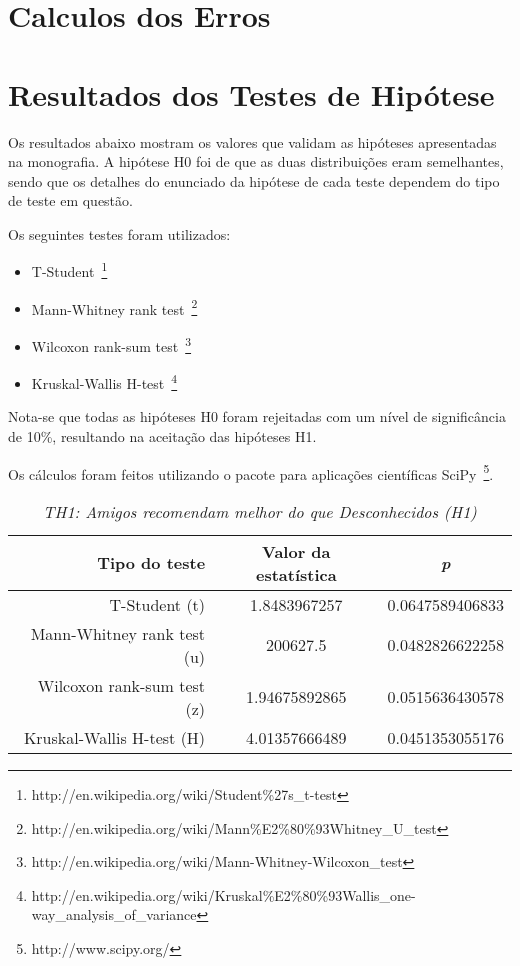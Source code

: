 \appendix
\chapter{Calculos dos Erros}
\chapter{Resultados dos Testes de Hipótese}
\label{anexo_hipoteses}

Os resultados abaixo mostram os valores que validam as hipóteses apresentadas na monografia. A hipótese H0 foi de que as duas distribuições eram semelhantes, sendo que os detalhes do enunciado da hipótese de cada teste dependem do tipo de teste em questão.

Os seguintes testes foram utilizados:

\begin{itemize}
    \item T-Student~\footnote{http://en.wikipedia.org/wiki/Student\%27s\_t-test}
    \item Mann-Whitney rank test~\footnote{http://en.wikipedia.org/wiki/Mann\%E2\%80\%93Whitney\_U\_test}
    \item Wilcoxon rank-sum test~\footnote{http://en.wikipedia.org/wiki/Mann-Whitney-Wilcoxon\_test}
    \item Kruskal-Wallis H-test~\footnote{http://en.wikipedia.org/wiki/Kruskal\%E2\%80\%93Wallis\_one-way\_analysis\_of\_variance}

\end{itemize}

Nota-se que todas as hipóteses H0 foram rejeitadas com um nível de significância de 10\%, resultando na aceitação das hipóteses H1.

Os cálculos foram feitos utilizando o pacote para aplicações científicas SciPy~\footnote{http://www.scipy.org/}.

\begin{table}
\centering
\begin{tabular}{|r|c|c|}
    \hline
    \textbf{Tipo do teste} & \textbf{Valor da estatística} & \textbf{\textit{p}} \\
    \hline
T-Student (t) & 1.8483967257 & 0.0647589406833 \\
\hline 
Mann-Whitney rank test (u) & 200627.5 & 0.0482826622258 \\
\hline 
Wilcoxon rank-sum test (z) & 1.94675892865 & 0.0515636430578 \\
\hline 
Kruskal-Wallis H-test (H) & 4.01357666489 & 0.0451353055176 \\
\hline 

\end{tabular}
\caption{\it TH1: Amigos recomendam melhor do que Desconhecidos (H1)}
\end{table}


